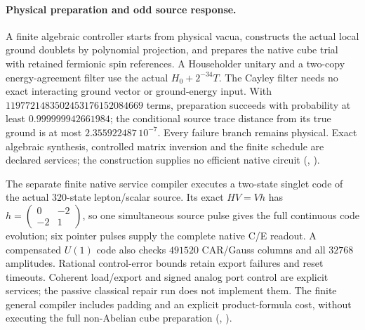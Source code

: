 \paragraph{Physical preparation and odd source response.}
A finite algebraic controller starts from physical vacua, constructs the
actual local ground doublets by polynomial projection, and prepares the
native cube trial with retained fermionic spin references. A Householder
unitary and a two-copy energy-agreement filter use the actual
$H_0+2^{-34}T$. The Cayley filter needs no exact interacting ground vector
or ground-energy input. With $1197721483502453176152084669$ terms,
preparation succeeds with probability at least $0.999999942661984$;
the conditional source trace distance from its true ground is at most
$2.355922487\,10^{-7}$. Every failure branch remains physical. Exact
algebraic synthesis, controlled matrix inversion and the finite schedule
are declared services; the construction supplies no efficient native circuit
(, \cite{ophrepo}).

The separate finite native service compiler executes a two-state
singlet code of the actual $320$-state lepton/scalar source. Its exact
$HV=Vh$ has $h=\left(\begin{smallmatrix}0&-2\\-2&1\end{smallmatrix}\right)$,
so one simultaneous source pulse gives the full continuous code evolution;
six pointer pulses supply the complete native C/E readout. A compensated
$U(1)$ code also checks $491520$ CAR/Gauss columns and all $32768$
amplitudes. Rational control-error bounds retain export failures and
reset timeouts. Coherent load/export and signed analog port control are
explicit services; the passive classical repair run does not implement
them. The finite general compiler includes padding and an explicit
product-formula cost, without executing the full non-Abelian cube
preparation (, \cite{ophrepo}).

